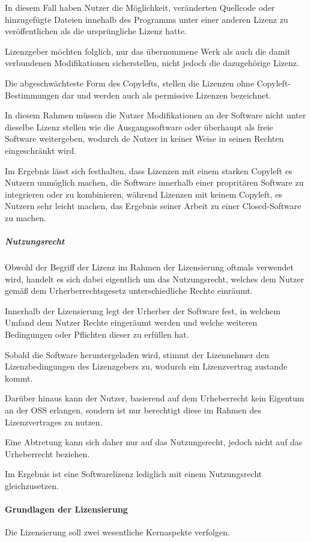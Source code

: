 In diesem Fall haben Nutzer die Möglichkeit, veränderten Quellcode oder hinzugefügte Dateien innehalb des Programms unter einer anderen Lizenz zu veröffentlichen als die ursprüngliche Lizenz hatte. 

Lizenzgeber möchten folglich, nur das übernommene Werk als auch die damit verbundenen Modifikationen sicherstellen, nicht jedoch die dazugehörige Lizenz. 

Die abgeschwächteste Form des Copylefts, stellen die Lizenzen ohne Copyleft-Bestimmungen dar und werden auch als permissive Lizenzen bezeichnet.

In diesem Rahmen müssen die Nutzer Modifikationen an der Software nicht unter dieselbe Lizenz stellen wie die Ausgangssoftware oder überhaupt als freie Software weitergeben, wodurch de Nutzer in keiner Weise in seinen Rechten eingeschränkt wird. 

Im Ergebnis lässt sich festhalten, dass Lizenzen mit einem starken Copyleft es Nutzern unmöglich machen, die Software innerhalb einer propritären Software zu integrieren oder zu kombinieren, während Lizenzen mit keinem Copyleft, es Nutzern sehr leicht machen, das Ergebnis seiner Arbeit zu einer Closed-Software zu machen.  

\subparagraph{Nutzungsrecht}
Obwohl der Begriff der Lizenz im Rahmen der Lizensierung oftmals verwendet wird, handelt es sich dabei eigentlich um das Nutzungsrecht, welches dem Nutzer gemäß dem Urherberrechtsgesetz unterschiedliche Rechte einräumt. 

Innerhalb der Lizensierung legt der Urherber der Software fest, in welchem Umfand dem Nutzer Rechte eingeräumt werden und welche weiteren Bedingungen oder Pflichten dieser zu erfüllen hat. 

Sobald die Software heruntergeladen wird, stimmt der Lizennehmer den Lizenzbedingungen des Lizenzgebers zu, wodurch ein Lizenzvertrag zustande kommt. \cite{wilmer_rechtliche_2021} 

Darüber hinaus kann der Nutzer, basierend auf dem Urheberrecht kein Eigentum an der OSS erlangen, sondern ist nur berechtigt diese im Rahmen des Lizenzvertrages zu nutzen. 

Eine Abtretung kann sich daher nur auf das Nutzungsrecht, jedoch nicht auf das Urheberrecht beziehen. 

Im Ergebnis ist eine Softwarelizenz lediglich mit einem Nutzungsrecht gleichzusetzen.\cite[S. 29]{kees_open_2015}

\paragraph{Grundlagen der Lizensierung}
Die Lizensierung soll zwei wesentliche Kernaspekte verfolgen. 

